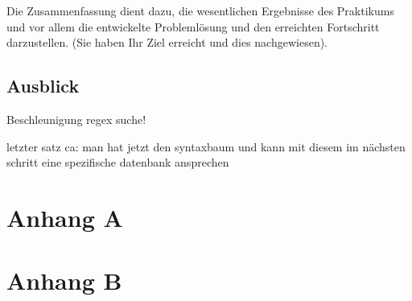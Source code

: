 \documentclass[oneside]{ausarbeitung}
\begin{document}
Die Zusammenfassung dient dazu, die wesentlichen Ergebnisse des
Praktikums und vor allem die entwickelte Problemlösung und den
erreichten Fortschritt darzustellen. (Sie haben Ihr Ziel erreicht und
dies nachgewiesen).

\section{Ausblick}
\label{sec:ausblick}

Beschleunigung regex suche!
	
	letzter satz ca:
	man hat jetzt den syntaxbaum und kann mit diesem im nächsten schritt eine spezifische datenbank ansprechen

\appendix

\printbibliography[heading=bibintoc]

\chapter{Anhang A}



\chapter{Anhang B}
\end{document}
